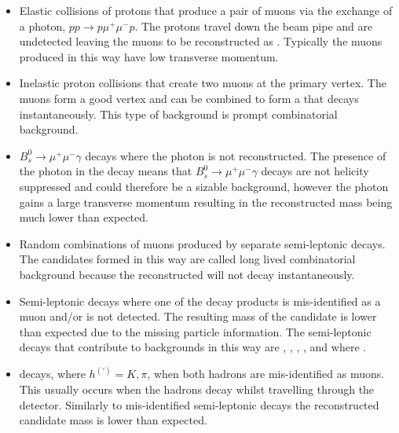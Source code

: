 \begin{itemize}
\item Elastic collisions of protons that produce a pair of muons via the exchange of a photon, $pp \to p \mu^{+} \mu^{-} p$. The protons travel down the beam pipe and are undetected leaving the muons to be reconstructed as \bmumu. Typically the muons produced in this way have low transverse momentum. %
\item Inelastic proton collisions that create two muons at the primary vertex. The muons form a good vertex and can be combined to form a \bsd that decays instantaneously. This type of background is prompt combinatorial background. 
\item $B_{s}^{0}\to\mu^{+}\mu^{-}\gamma$ decays where the photon is not reconstructed. The presence of the photon in the decay means that $B_{s}^{0}\to\mu^{+}\mu^{-}\gamma$ decays are not helicity suppressed and could therefore be a sizable background, however the photon gains a large transverse momentum resulting in the reconstructed \bsd mass being much lower than expected.
\item Random combinations of muons produced by separate semi-leptonic decays. The \bmumu candidates formed in this way are called long lived combinatorial background because the reconstructed \bsd will not decay instantaneously. %
\item Semi-leptonic decays where one of the decay products is mis-identified as a muon and/or is not detected. The resulting mass of the \bsd candidate is lower than expected due to the missing particle information. The semi-leptonic decays that contribute to \bmumu backgrounds in this way are \bdpimunu, \bsKmunu, \lambdab, \bupimumu, \bdpimumu and \bcjpsimunu where \jpsimumu. %
\item \bhh decays, where $ h^{(')}  = K, \pi$, when both hadrons are mis-identified as muons. This usually occurs when the hadrons decay whilst travelling through the detector. Similarly to mis-identified semi-leptonic decays the reconstructed \bsd candidate mass is lower than expected. %
\end{itemize}

